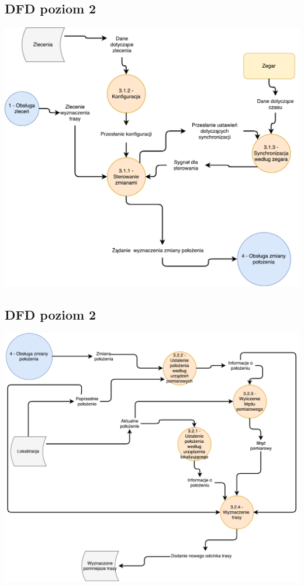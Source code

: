 \documentclass[11pt]{article}
\begin{document}
	\subsection{DFD poziom 2}
	\begin{center}
		\includegraphics[scale=0.65]{DFD31.pdf}
	\end{center}
	\newpage
	\subsection{DFD poziom 2}
	\begin{center}
		\includegraphics[scale=0.65]{DFD32.pdf}
	\end{center}
\end{document}
